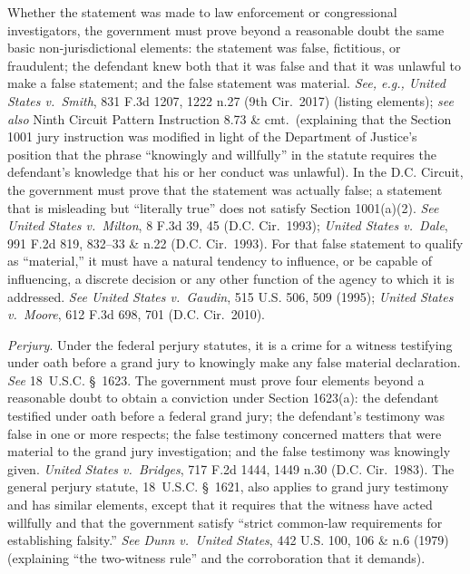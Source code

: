 Whether the statement was made to law enforcement or congressional investigators, the government must prove beyond a reasonable doubt the same basic non-jurisdictional elements: the statement was false, fictitious, or fraudulent; the defendant knew both that it was false and that it was unlawful to make a false statement; and the false statement was material.
\textit{See, e.g., United States v.\ Smith}, 831 F.3d 1207, 1222 n.27 (9th Cir.~2017) (listing elements); \textit{see also} Ninth Circuit Pattern Instruction 8.73 \& cmt.\ (explaining that the Section 1001 jury instruction was modified in light of the Department of Justice's position that the phrase ``knowingly and willfully'' in the statute requires the defendant's knowledge that his or her conduct was unlawful).
In the D.C. Circuit, the government must prove that the statement was actually false; a statement that is misleading but ``literally true'' does not satisfy Section 1001(a)(2).
\textit{See United States v.\ Milton}, 8 F.3d 39, 45 (D.C. Cir.~1993); \textit{United States v.\ Dale}, 991 F.2d 819, 832--33 \& n.22 (D.C. Cir.~1993).
For that false statement to qualify as ``material,'' it must have a natural tendency to influence, or be capable of influencing, a discrete decision or any other function of the agency to which it is addressed.
\textit{See United States v.\ Gaudin}, 515 U.S. 506, 509 (1995); \textit{United States v.\ Moore}, 612 F.3d 698, 701 (D.C. Cir.~2010).

\textit{Perjury}.
Under the federal perjury statutes, it is a crime for a witness testifying under oath before a grand jury to knowingly make any false material declaration.
\textit{See} 18~U.S.C. \S~1623.
The government must prove four elements beyond a reasonable doubt to obtain a conviction under Section 1623(a): the defendant testified under oath before a federal grand jury; the defendant's testimony was false in one or more respects; the false testimony concerned matters that were material to the grand jury investigation; and the false testimony was knowingly given.
\textit{United States v.\ Bridges}, 717 F.2d 1444, 1449 n.30 (D.C. Cir.~1983).
The general perjury statute, 18~U.S.C. \S~1621, also applies to grand jury testimony and has similar elements, except that it requires that the witness have acted willfully and that the government satisfy ``strict common-law requirements for establishing falsity.''
\textit{See Dunn v.\ United States}, 442 U.S. 100, 106 \& n.6 (1979) (explaining ``the two-witness rule'' and the corroboration that it demands).

